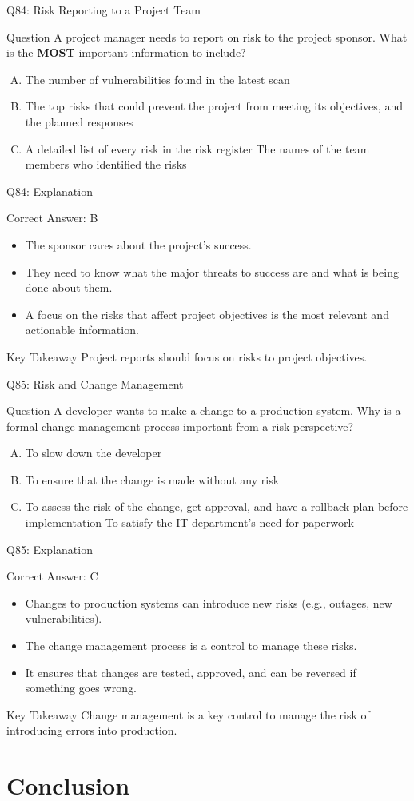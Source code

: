 \documentclass[aspectratio=169]{beamer}
\newcommand{\hq}[7]{%
	\begin{frame}{Q#1: #2}
		\begin{block}{Question}
			#3
		\end{block}
		\begin{enumerate}[(A)]
			#4
		\end{enumerate}
	\end{frame}
	\begin{frame}{Q#1: Explanation}
		\begin{block}{Correct Answer: #5}
			\begin{itemize}
				#6
			\end{itemize}
		\end{block}
		\begin{alertblock}{Key Takeaway}
			#7
		\end{alertblock}
	\end{frame}
}
\begin{document}
{		\hq{84}{Risk Reporting to a Project Team}
		{A project manager needs to report on risk to the project sponsor. What is the \textbf{MOST} important information to include?}
		{\item The number of vulnerabilities found in the latest scan
			\item The top risks that could prevent the project from meeting its objectives, and the planned responses
			\item A detailed list of every risk in the risk register
			\ditem The names of the team members who identified the risks}
		{B}
		{\item The sponsor cares about the project's success.
			\item They need to know what the major threats to success are and what is being done about them.
			\item A focus on the risks that affect project objectives is the most relevant and actionable information.}
		{Project reports should focus on risks to project objectives.}
		
		\hq{85}{Risk and Change Management}
		{A developer wants to make a change to a production system. Why is a formal change management process important from a risk perspective?}
		{\item To slow down the developer
			\item To ensure that the change is made without any risk
			\item To assess the risk of the change, get approval, and have a rollback plan before implementation
			\ditem To satisfy the IT department's need for paperwork}
		{C}
		{\item Changes to production systems can introduce new risks (e.g., outages, new vulnerabilities).
			\item The change management process is a control to manage these risks.
			\item It ensures that changes are tested, approved, and can be reversed if something goes wrong.}
		{Change management is a key control to manage the risk of introducing errors into production.}
		
		\section{Conclusion}
		
}
\end{document}
